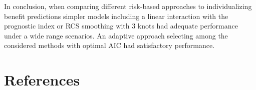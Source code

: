 \documentclass{article}
\begin{document}
In conclusion, when comparing different risk-based approaches to
individualizing benefit predictions simpler models including a linear
interaction with the prognostic index or RCS smoothing with 3 knots had
adequate performance under a wide range scenarios. An adaptive approach
selecting among the considered methods with optimal AIC had satisfactory
performance.

\newpage

\hypertarget{references}{%
\section{References}\label{references}}

\nolinenumbers
\setlength{\parindent}{-0.25in}
\setlength{\leftskip}{0.25in}

\noindent
\end{document}
